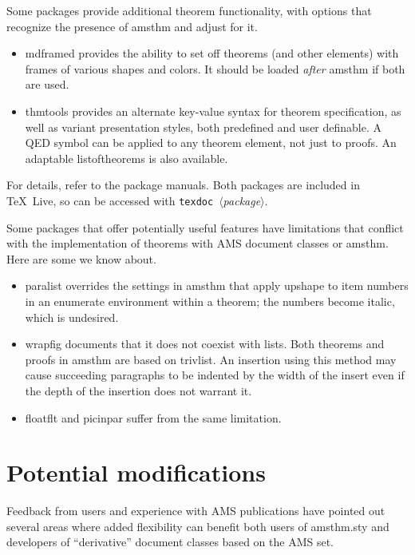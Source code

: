 \documentclass[11pt,twoside]{article}
\newcommand{\ntt}{%
  \fontfamily\ttdefault \fontseries\mddefault \fontshape\updefault
  \selectfont
}
\DeclareRobustCommand{\cn}[1]{{\ntt\bslchar#1}}
\DeclareRobustCommand{\pkg}[1]{{\ntt#1}}
\DeclareRobustCommand{\env}[1]{{\ntt#1}}
\def\<#1>{{\normalfont$\langle$\textit{#1}$\rangle$}}
\begin{document}
Some packages provide additional theorem functionality, with options
that recognize the presence of \pkg{amsthm} and adjust for it.
\begin{itemize}
\itemsep=.5\itemsep
\item \pkg{mdframed} \cite{MDF} provides the ability to set off theorems
  (and other elements) with frames of various shapes and colors.
  It should be loaded \emph{after} \pkg{amsthm} if both are used.
\item \pkg{thmtools} \cite{THT} provides an alternate key-value syntax
  for theorem specification, as well as variant presentation styles,
  both predefined and user definable.  A QED symbol can be applied to any
  theorem element, not just to proofs.  An adaptable \cn{listoftheorems}
  is also available.
\end{itemize}
For details, refer to the package manuals.  Both packages are included
in \TeX~Live, so can be accessed with
\texttt{texdoc}~\<package>.

Some packages that offer potentially useful features have limitations
that conflict with the implementation of theorems with AMS document
classes or \pkg{amsthm}.  Here are some we know about.
\begin{itemize}
\itemsep=.5\itemsep
\item \pkg{paralist} overrides the settings in \pkg{amsthm} that apply
  \cn{upshape} to item numbers in an \env{enumerate} environment within
  a theorem; the numbers become italic, which is undesired.
\item \pkg{wrapfig} documents that it does not coexist with lists.
  Both theorems and proofs in \pkg{amsthm} are based on \cn{trivlist}.
  An insertion using this method may cause succeeding paragraphs to be
  indented by the width of the insert even if the depth of the
  insertion does not warrant it.
\item \pkg{floatflt} and \pkg{picinpar} suffer from the same limitation.
\end{itemize}


\section{Potential modifications}

Feedback from users and experience with AMS publications have pointed
out several areas where added flexibility can benefit both users of
\pkg{amsthm.sty} and developers of ``derivative'' document classes
based on the AMS set.
\end{document}
